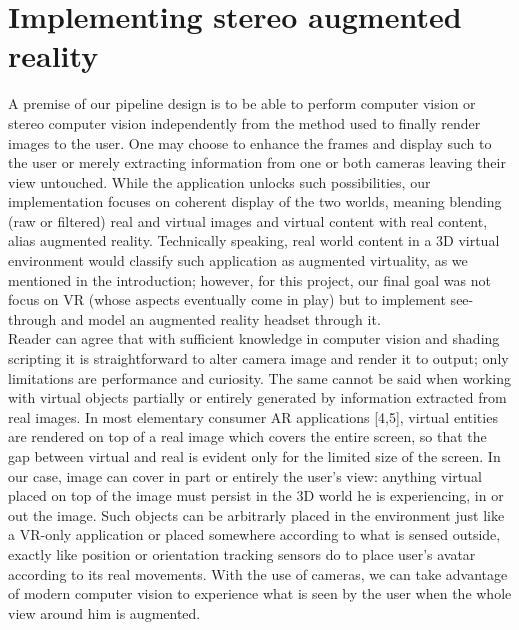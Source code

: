 \section{Implementing stereo augmented reality}
A premise of our pipeline design is to be able to perform computer vision or stereo computer vision independently from the method used to finally render images to the user. One may choose to enhance the frames and display such to the user or merely extracting information from one or both cameras leaving their view untouched. While the application unlocks such possibilities, our implementation focuses on coherent display of the two worlds, meaning blending (raw or filtered) real and virtual images and virtual content with real content, alias augmented reality. Technically speaking, real world content in a 3D virtual environment would classify such application as augmented virtuality, as we mentioned in the introduction; however, for this project, our final goal was not focus on VR (whose aspects eventually come in play) but to implement see-through and model an augmented reality headset through it.\\
Reader can agree that with sufficient knowledge in computer vision and shading scripting it is straightforward to alter camera image and render it to output; only limitations are performance and curiosity. The same cannot be said when working with virtual objects partially or entirely generated by information extracted from real images. In most elementary consumer AR applications [4,5], virtual entities are rendered on top of a real image which covers the entire screen, so that the gap between virtual and real is evident only for the limited size of the screen. In our case, image can cover in part or entirely the user's view: anything virtual placed on top of the image must persist in the 3D world he is experiencing, in or out the image. Such objects can be arbitrarly placed in the environment just like a VR-only application or placed somewhere according to what is sensed outside, exactly like position or orientation tracking sensors do to place user's avatar according to its real movements. With the use of cameras, we can take advantage of modern computer vision to experience what is seen by the user when the whole view around him is augmented.\\
